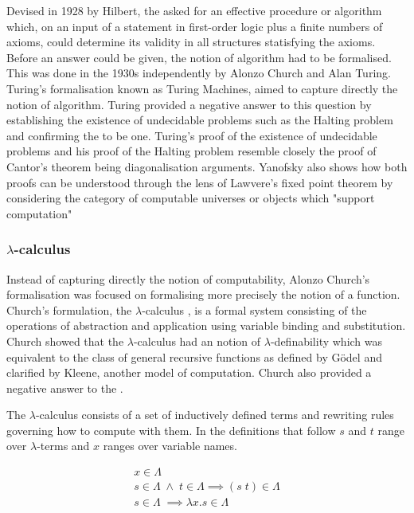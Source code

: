 Devised in 1928 by Hilbert, the \ent{} asked for an effective procedure or
algorithm which, on an input of a statement in first-order logic plus a finite
numbers of axioms, could determine its validity in all structures statisfying
the axioms. Before an answer could be given, the notion of algorithm had to be
formalised. This was done in the 1930s independently by Alonzo Church and Alan
Turing. Turing's formalisation \cite{turing1937computable} known as Turing
Machines, aimed to capture directly the notion of algorithm. Turing provided a
negative answer to this question by establishing the existence of undecidable
problems such as the Halting problem and confirming the \ent{} to be one. Turing's proof of the existence of undecidable problems
and his proof of the Halting problem resemble closely the proof of Cantor's
theorem being diagonalisation arguments. Yanofsky \cite{yanofsky2003universal}
also  shows how both proofs can be understood through the lens of Lawvere's
fixed point theorem by considering the category of computable universes or
objects which "support computation"

\subsubsection{$\lambda$-calculus}
Instead of capturing directly the notion of computability, Alonzo Church's
formalisation was focused on formalising more precisely the notion of a
function.  Church's formulation, the $\lambda$-calculus \cite{church1932set}, is
a formal system consisting of the operations of abstraction and application
using variable binding and substitution. Church showed that the
$\lambda$-calculus had an notion of $\lambda$-definability
\cite{church1936unsolvable} which was equivalent to the class of general
recursive functions \cite{kleene1936general} as defined by G{\"o}del and
clarified by Kleene, another model of computation.  Church also provided a
negative answer to the \ent.

The $\lambda$-calculus consists of a set of inductively defined terms and
rewriting rules governing how to compute with them. In the definitions that
follow $s$ and $t$ range over $\lambda$-terms and $x$ ranges over variable
names.

\begin{definition*}
    \begin{gather*}
        x \in \Lambda \\
        s \in \Lambda \; \land \; t \in \Lambda \implies (s \; t) \in \Lambda \\
        s \in \Lambda \; \implies \lambda x . s \in \Lambda
    \end{gather*}
\end{definition*}

